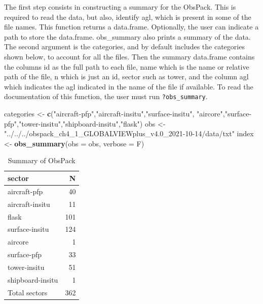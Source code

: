 \documentclass[preprint, 3p,
authoryear]{elsarticle} %
\newenvironment{Shaded}{\begin{snugshade}}{\end{snugshade}}
\newcommand{\AttributeTok}[1]{\textcolor[rgb]{0.13,0.29,0.53}{#1}}
\newcommand{\FunctionTok}[1]{\textcolor[rgb]{0.13,0.29,0.53}{\textbf{#1}}}
\newcommand{\NormalTok}[1]{#1}
\newcommand{\OtherTok}[1]{\textcolor[rgb]{0.56,0.35,0.01}{#1}}
\newcommand{\StringTok}[1]{\textcolor[rgb]{0.31,0.60,0.02}{#1}}
\begin{document}
The first step consists in constructing a summary for the ObsPack. This
is required to read the data, but also, identify agl, which is present
in some of the file names. This function returns a data.frame.
Optionally, the user can indicate a path to store the data.frame.
obs\_summary also prints a summary of the data. The second argument is
the categories, and by default includes the categories shown below, to
account for all the files. Then the summary data.frame contains the
columns id as the full path to each file, name which is the name or
relative path of the file, n which is just an id, sector such as tower,
and the column agl which indicates the agl indicated in the name of the
file if available. To read the documentation of this function, the user
must run \texttt{?obs\_summary}.

\begin{Shaded}
\begin{Highlighting}[]
\NormalTok{categories }\OtherTok{\textless{}{-}} \FunctionTok{c}\NormalTok{(}\StringTok{"aircraft{-}pfp"}\NormalTok{,}\StringTok{"aircraft{-}insitu"}\NormalTok{,}\StringTok{"surface{-}insitu"}\NormalTok{,}
  \StringTok{"aircore"}\NormalTok{,}\StringTok{"surface{-}pfp"}\NormalTok{,}\StringTok{"tower{-}insitu"}\NormalTok{,}\StringTok{"shipboard{-}insitu"}\NormalTok{,}\StringTok{"flask"}\NormalTok{)}
\NormalTok{obs }\OtherTok{\textless{}{-}} \StringTok{"../../../obspack\_ch4\_1\_GLOBALVIEWplus\_v4.0\_2021{-}10{-}14/data/txt"}
\NormalTok{index }\OtherTok{\textless{}{-}} \FunctionTok{obs\_summary}\NormalTok{(}\AttributeTok{obs =}\NormalTok{ obs, }\AttributeTok{verbose =}\NormalTok{ F)}
\end{Highlighting}
\end{Shaded}

\begin{table}

\caption{\label{tab:kable}Summary of ObsPack}
\centering
\begin{tabular}[t]{l|r}
\hline
sector & N\\
\hline
aircraft-pfp & 40\\
\hline
aircraft-insitu & 11\\
\hline
flask & 101\\
\hline
surface-insitu & 124\\
\hline
aircore & 1\\
\hline
surface-pfp & 33\\
\hline
tower-insitu & 51\\
\hline
shipboard-insitu & 1\\
\hline
Total sectors & 362\\
\hline
\end{tabular}
\end{table}
\end{document}
